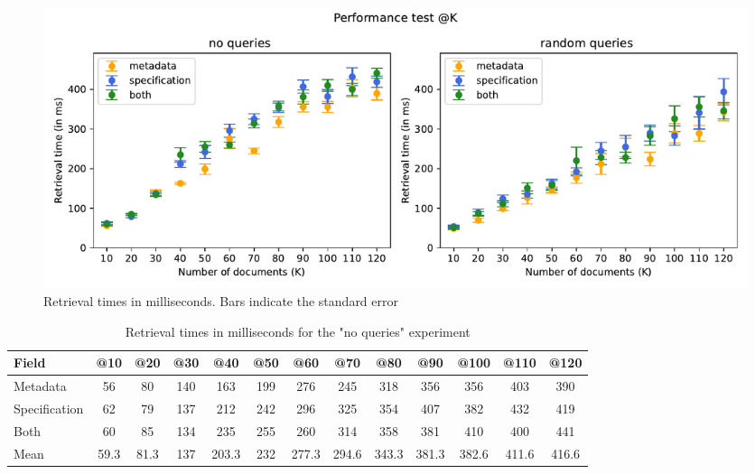\begin{figure}[!h]
    \begin{center}
        \includegraphics[width=0.8\linewidth]{assets/pdf/evaluation/time}
    \end{center}

    \caption{Retrieval times in milliseconds. Bars indicate the standard error}
    \label{fig:time}
\end{figure}

\begin{table}[!h]
    \begin{center}
        \begin{tabular}{l c c c c c c c c c c c c}
            \hline
            \textbf{Field} & \textbf{@10} & \textbf{@20} & \textbf{@30} & \textbf{@40} & \textbf{@50} & \textbf{@60} & \textbf{@70} & \textbf{@80} & \textbf{@90} & \textbf{@100} & \textbf{@110} & \textbf{@120} \\ \hline
            Metadata & 56 & 80 & 140 & 163 & 199 & 276 & 245 & 318 & 356 & 356 & 403 & 390 \\
            Specification & 62 & 79 & 137 & 212 & 242 & 296 & 325 & 354 & 407 & 382 & 432 & 419 \\
            Both & 60 & 85 & 134 & 235 & 255 & 260 & 314 & 358 & 381 & 410 & 400 & 441 \\ \hline \hline
            Mean & 59.3 & 81.3 & 137 & 203.3 & 232 & 277.3 & 294.6 & 343.3 & 381.3 & 382.6 & 411.6 & 416.6 \\ \hline
        \end{tabular}
    \end{center}

    \caption{Retrieval times in milliseconds for the "no queries" experiment}
    \label{tab:times-no-queries}
\end{table}


